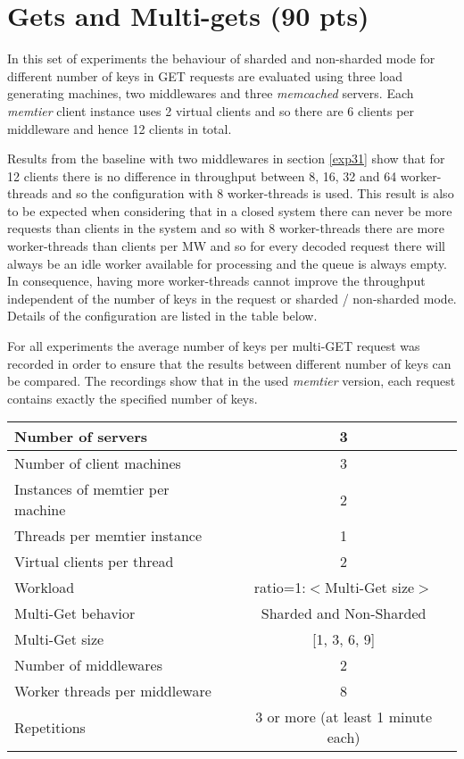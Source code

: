 \documentclass[report.tex]{subfiles}
\begin{document}
\section{Gets and Multi-gets (90 pts)}\label{exp5}


In this set of experiments the behaviour of sharded and non-sharded mode for different number of keys in GET requests are evaluated using three load generating machines, two middlewares and three \emph{memcached} servers.
Each \emph{memtier} client instance uses 2 virtual clients and so there are 6 clients per middleware and hence 12 clients in total. 

Results from the baseline with two middlewares in section \ref{exp31} show that for 12 clients there is no difference in throughput between 8, 16, 32 and 64 worker-threads and so the configuration with 8 worker-threads is used. This result is also to be expected when considering that in a closed system there can never be more requests than clients in the system and so with 8 worker-threads there are more worker-threads than clients per MW and so for every decoded request there will always be an idle worker available for processing and the queue is always empty. In consequence, having more worker-threads cannot improve the throughput independent of the number of keys in the request or sharded / non-sharded mode.
Details of the configuration are listed in the table below.

For all experiments the average number of keys per multi-GET request was recorded in order to ensure that the results between different number of keys can be compared. The recordings show that in the used \emph{memtier} version, each request contains exactly the specified number of keys.

\begin{center}
	\scriptsize{
		\begin{tabular}{|l|c|}
			\hline Number of servers                & 3                       \\ 
			\hline Number of client machines        & 3                       \\ 
			\hline Instances of memtier per machine & 2                       \\ 
			\hline Threads per memtier instance     & 1                       \\
			\hline Virtual clients per thread       & 2     		           \\ 
			\hline Workload                         & ratio=1:$<$Multi-Get size$>$         \\
			\hline Multi-Get behavior               & Sharded and Non-Sharded  \\
			\hline Multi-Get size                   & [1, 3, 6, 9]            \\
			\hline Number of middlewares            & 2                       \\
			\hline Worker threads per middleware    & 8 \\
			\hline Repetitions                      & 3 or more (at least 1 minute each)               \\ 
			\hline 
		\end{tabular}
	} 
\end{center}
\end{document}
